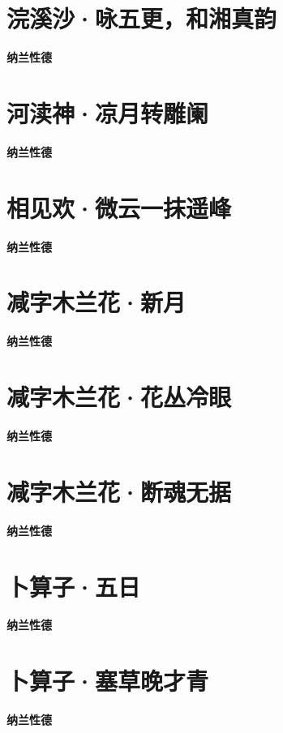 \documentclass[12pt,a4paper]{ctexbook}
\begin{document}
\section{浣溪沙·咏五更，和湘真韵}
\textbf{纳兰性德}\par\vspace{0.5em}

\section{ 河渎神·凉月转雕阑 }
\textbf{纳兰性德}\par\vspace{0.5em}

\section{相见欢·微云一抹遥峰}
\textbf{纳兰性德}\par\vspace{0.5em}

\section{减字木兰花·新月}
\textbf{纳兰性德}\par\vspace{0.5em}

\section{减字木兰花·花丛冷眼}
\textbf{纳兰性德}\par\vspace{0.5em}

\section{减字木兰花·断魂无据}
\textbf{纳兰性德}\par\vspace{0.5em}

\section{卜算子·五日}
\textbf{纳兰性德}\par\vspace{0.5em}

\section{卜算子·塞草晚才青}
\textbf{纳兰性德}\par\vspace{0.5em}
\end{document}
